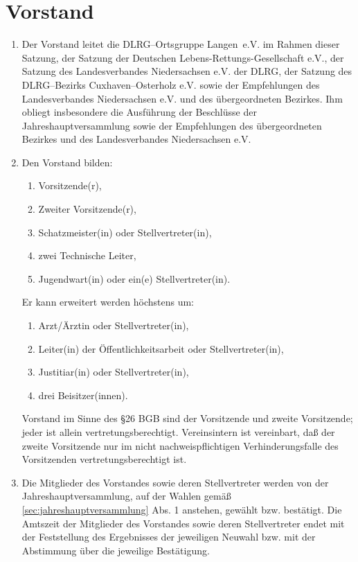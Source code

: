 \documentclass[%
12pt, %
a4paper, %
headsepline, %
footsepline, %
parskip, %
headings=normal, %
]{scrartcl}
\begin{document}
\section{Vorstand}
\label{sec:vorstand}
\begin{enumerate}
    \item Der Vorstand leitet die DLRG--Ortsgruppe Langen~e.V. im Rahmen dieser Satzung, der Satzung der Deutschen Lebens-Rettungs-Gesellschaft e.V., der Satzung des Landesverbandes Niedersachsen e.V. der DLRG, der Satzung des DLRG--Bezirks Cuxhaven--Osterholz e.V. sowie der Empfehlungen des Landesverbandes Niedersachsen e.V. und des übergeordneten Bezirkes. Ihm obliegt insbesondere die Ausführung der Beschlüsse der Jahreshauptversammlung sowie der Empfehlungen des übergeordneten Bezirkes und des Landesverbandes Niedersachsen e.V.
    \item Den Vorstand bilden:\begin{enumerate}[noitemsep]
        \item Vorsitzende(r),
        \item Zweiter Vorsitzende(r),
        \item Schatzmeister(in) oder Stellvertreter(in),
        \item zwei Technische Leiter,
        \item Jugendwart(in) oder ein(e) Stellvertreter(in).
      \end{enumerate}
      \setcounter{enumii}{6}
      Er kann erweitert werden höchstens um: \begin{enumerate}[noitemsep]
          \item Arzt/Ärztin oder Stellvertreter(in),
          \item Leiter(in) der Öffentlichkeitsarbeit oder Stellvertreter(in),
          \item Justitiar(in) oder Stellvertreter(in),
          \item drei Beisitzer(innen).
        \end{enumerate}
    Vorstand im Sinne des \S 26 BGB sind der Vorsitzende und zweite Vorsitzende; jeder ist allein vertretungsberechtigt. Vereinsintern ist vereinbart, daß der zweite Vorsitzende nur im nicht nachweispflichtigen Verhinderungsfalle des Vorsitzenden vertretungsberechtigt ist.
    \item Die Mitglieder des Vorstandes sowie deren Stellvertreter werden von der Jahreshauptversammlung, auf der Wahlen gemäß \ref{sec:jahreshauptversammlung} Abs. 1 anstehen, gewählt bzw. bestätigt. Die Amtszeit der Mitglieder des Vorstandes sowie deren Stellvertreter endet mit der Feststellung des Ergebnisses der jeweiligen Neuwahl bzw. mit der Abstimmung über die jeweilige Bestätigung.

\end{enumerate}
\end{document}
